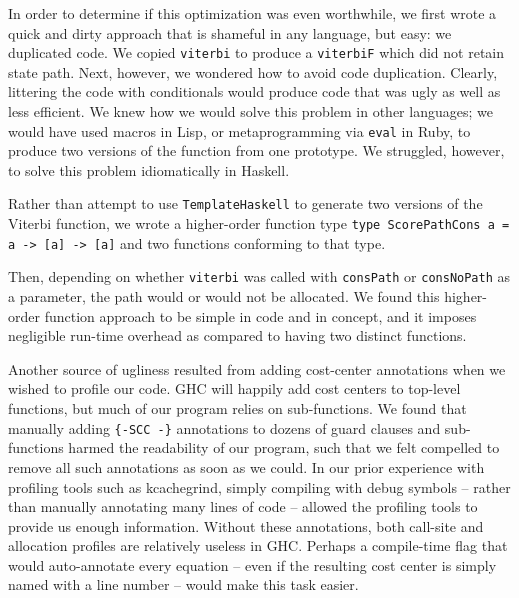 \documentclass[preprint,nonatbib,blockstyle,nocopyrightspace,times]{sigplanconf}
\begin{document}
In order to determine if this optimization was even worthwhile, we first wrote 
a quick and dirty approach that is shameful in any language, but easy: we 
duplicated code.
We copied \texttt{viterbi} to produce a \texttt{viterbiF} 
which did not retain state path.
Next, however, we wondered how to avoid code 
duplication.
Clearly, littering the code with conditionals would produce code 
that was ugly as well as less efficient.
We knew how we would solve this 
problem in other languages; we would have used macros in Lisp, or 
metaprogramming via \texttt{eval} in Ruby, to produce two versions of the 
function from one prototype.
We struggled, however, to solve this problem 
idiomatically in Haskell.

Rather than attempt to use \texttt{TemplateHaskell} to generate two versions of 
the Viterbi function, we wrote a higher-order function type 
\lstinline!type ScorePathCons a = a -> [a] -> [a]! and two functions conforming to that type.

Then, depending on whether \texttt{viterbi} was called with \texttt{consPath} 
or \texttt{consNoPath} as a parameter, the path would or would not be 
allocated.
We found this higher-order function approach to be simple in code 
and in concept, and it imposes negligible run-time overhead as compared to 
having two distinct functions.



Another source of ugliness resulted from adding cost-center annotations when we 
wished to profile our code.
GHC will happily add cost centers to top-level 
functions, but much of our program relies on sub-functions.
We found that 
manually adding \texttt{\{-SCC -\}} annotations to dozens of guard clauses and 
sub-functions harmed the readability of our program, such that we felt 
compelled to remove all such annotations as soon as we could.
In our prior 
experience with profiling tools such as kcachegrind, simply compiling with 
debug symbols -- rather than manually annotating many lines of code -- allowed 
the profiling tools to provide us enough information.
Without these 
annotations, both call-site and allocation profiles are relatively useless in 
GHC.
Perhaps a compile-time flag that would auto-annotate every equation -- 
even if the resulting cost center is simply named with a line number -- would 
make this task easier.
\end{document}
